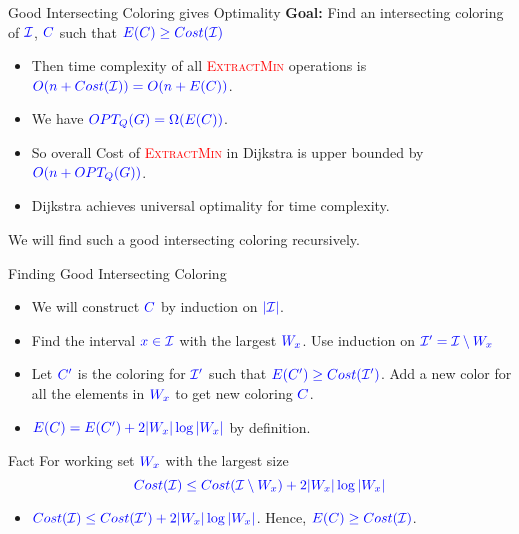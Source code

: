 \documentclass[10pt, handout]{beamer}
\begin{document}
\begin{frame}{Good Intersecting Coloring gives Optimality}
	\textbf{Goal:} Find an intersecting coloring of $\mathcolor{blue}{\mathcal{I}}$, $\mathcolor{blue}{C}$ such that $\mathcolor{blue}{E(C)\geq Cost(\mathcal{I})}$\pause

	\begin{itemize}
		\item Then time complexity of all \textcolor{red}{\textsc{ExtractMin}} operations is $\mathcolor{blue}{O(n+Cost(\mathcal{I}))=O(n+E(C))}$.\pause
		\item We have  $\mathcolor{blue}{OPT_Q(G)=\Omega (E(C))}$.\pause
		\item So overall Cost of \textcolor{red}{\textsc{ExtractMin}} in Dijkstra is upper bounded by $\mathcolor{blue}{O(n+OPT_Q(G))}$.\pause
		\item Dijkstra achieves universal optimality for time complexity.\pause
	\end{itemize}
	\vfill

	We will find such a good intersecting coloring recursively.
\end{frame}
\begin{frame}{Finding Good Intersecting Coloring}
	\begin{itemize}
		\item We will construct $\mathcolor{blue}{C}$ by induction on $\mathcolor{blue}{|\mathcal{I}|}$.\pause
		\item Find the interval $\mathcolor{blue}{x\in\mathcal{I}}$ with the largest $\mathcolor{blue}{W_x}$. Use induction on $\mathcolor{blue}{\mathcal{I}'=\mathcal{I}\setminus W_x}$\pause
		\item Let $\mathcolor{blue}{C'}$ is the coloring for $\mathcolor{blue}{\mathcal{I}'}$ such that $\mathcolor{blue}{E(C')\geq Cost(\mathcal{I}')}$. Add a new color for all the elements in $\mathcolor{blue}{W_x}$ to get new coloring $\mathcolor{blue}{C}$.\pause
		\item $\mathcolor{blue}{E(C)=E(C')+2|W_x|\log|W_x|}$ by definition. \pause
	\end{itemize}







	\begin{alertblock}{Fact}
		For working set $\mathcolor{blue}{W_x}$ with the largest size $$\mathcolor{blue}{Cost(\mathcal{I})\leq Cost(\mathcal{I}\setminus W_x)+2|W_x|\log |W_x|}$$
	\end{alertblock}\pause
	\begin{itemize}
		\item $\mathcolor{blue}{Cost(\mathcal{I})\leq Cost(\mathcal{I}')+2|W_x|\log|W_x|}$. Hence, $\mathcolor{blue}{E(C)\geq Cost(\mathcal{I})}$.
	\end{itemize}

\end{frame}
\end{document}
